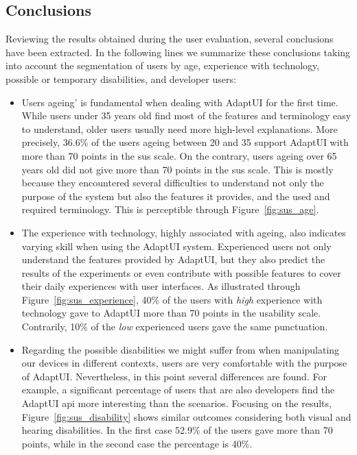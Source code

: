 \subsection{Conclusions}
\label{sec:user_evaluation_conclusions}

Reviewing the results obtained during the user evaluation, several conclusions 
have been extracted. In the following lines we summarize these conclusions taking 
into account the segmentation of users by age, experience with technology, possible 
or temporary disabilities, and developer users:

\begin{itemize}
  \item Users ageing' is fundamental when dealing with AdaptUI for the first 
  time. While users under 35 years old find most of the features and terminology 
  easy to understand, older users usually need more high-level explanations. 
  More precisely, 36.6\% of the users ageing between 20 and 35 support AdaptUI 
  with more than 70 points in the \ac{sus} scale. On the contrary, users ageing 
  over 65 years old did not give more than 70 points in the \ac{sus} scale. This 
  is mostly because they encountered several difficulties to understand not only 
  the purpose of the system but also the features it provides, and the used and 
  required terminology. This is perceptible through Figure~\ref{fig:sus_age}.
  
  \item The experience with technology, highly associated with ageing, also 
  indicates varying skill when using the AdaptUI system. Experienced users
  not only understand the features provided by AdaptUI, but they also predict
  the results of the experiments or even contribute with possible features to 
  cover their daily experiences with user interfaces. As illustrated through
  Figure~\ref{fig:sus_experience}, 40\% of the users with \textit{high} 
  experience with technology gave to AdaptUI more than 70 points in the 
  usability scale. Contrarily, 10\% of the \textit{low} experienced users gave
  the same punctuation.
  
  \item Regarding the possible disabilities we might suffer from when 
  manipulating our devices in different contexts, users are very comfortable 
  with the purpose of AdaptUI. Nevertheless, in this point several differences
  are found. For example, a significant percentage of users that are
  also developers find the AdaptUI \ac{api} more interesting than the scenarios. 
  Focusing on the results, Figure~\ref{fig:sus_disability} shows similar outcomes 
  considering both visual and hearing disabilities. In the first case 52.9\% of 
  the  users gave more than 70 points, while in the second case the percentage 
  is 40\%.
  

\end{itemize}

